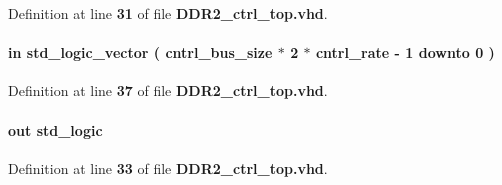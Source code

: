 Definition at line {\bf 31} of file {\bf D\+D\+R2\+\_\+ctrl\+\_\+top.\+vhd}.

\paragraph[{wcmd\+\_\+data}]{ {\bfseries \textcolor{keywordflow}{in}\textcolor{vhdlchar}{ }} {\bfseries \textcolor{comment}{std\+\_\+logic\+\_\+vector}\textcolor{vhdlchar}{ }\textcolor{vhdlchar}{(}\textcolor{vhdlchar}{ }\textcolor{vhdlchar}{ }\textcolor{vhdlchar}{ }\textcolor{vhdlchar}{ }{\bfseries {\bf cntrl\+\_\+bus\+\_\+size}} \textcolor{vhdlchar}{$\ast$}\textcolor{vhdlchar}{ } \textcolor{vhdldigit}{2} \textcolor{vhdlchar}{$\ast$}\textcolor{vhdlchar}{ }\textcolor{vhdlchar}{ }\textcolor{vhdlchar}{ }{\bfseries {\bf cntrl\+\_\+rate}} \textcolor{vhdlchar}{-\/}\textcolor{vhdlchar}{ } \textcolor{vhdldigit}{1} \textcolor{vhdlchar}{ }\textcolor{keywordflow}{downto}\textcolor{vhdlchar}{ }\textcolor{vhdlchar}{ } \textcolor{vhdldigit}{0} \textcolor{vhdlchar}{ }\textcolor{vhdlchar}{)}\textcolor{vhdlchar}{ }} \hspace{0.3cm}{\ttfamily [Port]}}\label{classDDR2__ctrl__top_ade5d80b032c6e716dcc974389783df38}


Definition at line {\bf 37} of file {\bf D\+D\+R2\+\_\+ctrl\+\_\+top.\+vhd}.

\paragraph[{wcmd\+\_\+rdy}]{ {\bfseries \textcolor{keywordflow}{out}\textcolor{vhdlchar}{ }} {\bfseries \textcolor{comment}{std\+\_\+logic}\textcolor{vhdlchar}{ }} \hspace{0.3cm}{\ttfamily [Port]}}\label{classDDR2__ctrl__top_a18c6936fe3d71dc654e783afea57bc5d}


Definition at line {\bf 33} of file {\bf D\+D\+R2\+\_\+ctrl\+\_\+top.\+vhd}.


